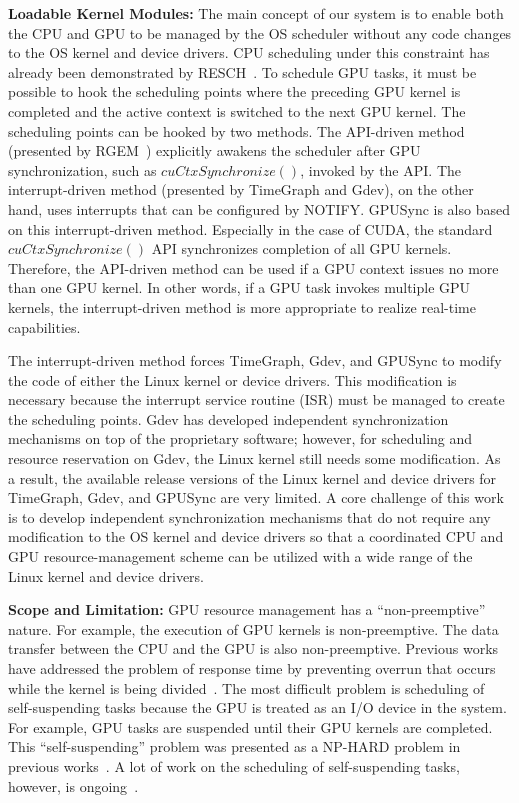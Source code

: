 \textbf{Loadable Kernel Modules:}
 The main concept of our system is to enable both the CPU and GPU to be managed by the OS scheduler without any code changes to the OS kernel and device drivers.
CPU scheduling under this constraint has already been demonstrated by RESCH~\cite{kato2009loadable, asberg2012exsched}.
To schedule GPU tasks, it must be possible to hook the scheduling points where the preceding GPU kernel is completed and the active context is switched to the next GPU kernel.
The scheduling points can be hooked by two methods.
The API-driven method (presented by RGEM~\cite{kato:rgem}) explicitly awakens the scheduler after GPU synchronization, such as $cuCtxSynchronize()$, invoked by the API.
The interrupt-driven method (presented by TimeGraph and Gdev), on the other hand, uses interrupts that can be configured by NOTIFY.
GPUSync is also based on this interrupt-driven method.
Especially in the case of CUDA, the standard $cuCtxSynchronize()$ API synchronizes completion of all GPU kernels.
Therefore, the API-driven method can be used if a GPU context issues no more than one GPU kernel.
In other words, if a GPU task invokes multiple GPU kernels, the interrupt-driven method is more appropriate to realize real-time capabilities.


The interrupt-driven method forces TimeGraph, Gdev, and GPUSync to modify the code of either the Linux kernel or device drivers.
This modification is necessary because the interrupt service routine (ISR) must be managed to create the scheduling points.
Gdev has developed independent synchronization mechanisms on top of the proprietary software; however, for scheduling and resource reservation on Gdev, the Linux kernel still needs some modification.
As a result, the available release versions of the Linux kernel and device drivers for TimeGraph, Gdev, and GPUSync are very limited.
A core challenge of this work is to develop independent synchronization mechanisms that do not require any modification to the OS kernel and device drivers so that a coordinated CPU and GPU resource-management scheme can be utilized with a wide range of the Linux kernel and device drivers.

\textbf{Scope and Limitation:} 
GPU resource management has a ``non-preemptive'' nature.
For example, the execution of GPU kernels is non-preemptive.
The data transfer between the CPU and the GPU is also non-preemptive.
Previous works have addressed the problem of response time by preventing overrun that occurs while the kernel is being divided~\cite{basaran:preemptive,sparc}.
The most difficult problem is scheduling of self-suspending tasks because the GPU is treated as an I/O device in the system.
For example, GPU tasks are suspended until their GPU kernels are completed.
This ``self-suspending'' problem was presented as a NP-HARD problem in previous works~\cite{self-sus:1,self-sus:2}.
A lot of work on the scheduling of self-suspending tasks, however, is ongoing~\cite{chattopadhyay2014limited,kim2013segment}.

